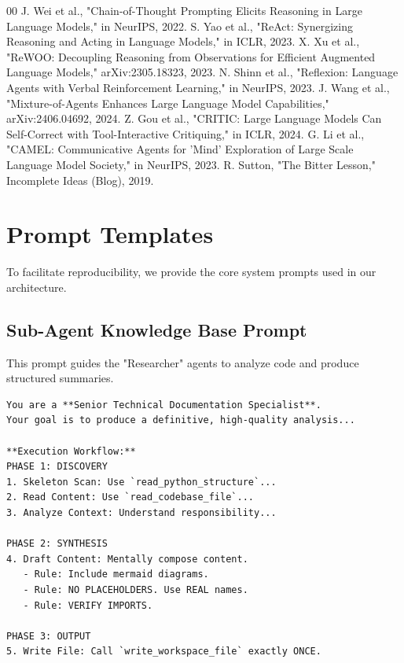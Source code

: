 \documentclass[conference]{IEEEtran}
\begin{document}
\begin{thebibliography}{00}
 J. Wei et al., "Chain-of-Thought Prompting Elicits Reasoning in Large Language Models," in NeurIPS, 2022.
 S. Yao et al., "ReAct: Synergizing Reasoning and Acting in Language Models," in ICLR, 2023.
 X. Xu et al., "ReWOO: Decoupling Reasoning from Observations for Efficient Augmented Language Models," arXiv:2305.18323, 2023.
 N. Shinn et al., "Reflexion: Language Agents with Verbal Reinforcement Learning," in NeurIPS, 2023.
 J. Wang et al., "Mixture-of-Agents Enhances Large Language Model Capabilities," arXiv:2406.04692, 2024.
 Z. Gou et al., "CRITIC: Large Language Models Can Self-Correct with Tool-Interactive Critiquing," in ICLR, 2024.
 G. Li et al., "CAMEL: Communicative Agents for 'Mind' Exploration of Large Scale Language Model Society," in NeurIPS, 2023.
 R. Sutton, "The Bitter Lesson," Incomplete Ideas (Blog), 2019.
\end{thebibliography}

\appendix
\section{Prompt Templates}
To facilitate reproducibility, we provide the core system prompts used in our architecture.

\subsection{Sub-Agent Knowledge Base Prompt}
This prompt guides the "Researcher" agents to analyze code and produce structured summaries.

\lstset{
    basicstyle=\scriptsize\ttfamily,
    breaklines=true,
    frame=single,
    columns=fullflexible
}

\begin{scriptsize}
\begin{lstlisting}
You are a **Senior Technical Documentation Specialist**. 
Your goal is to produce a definitive, high-quality analysis...

**Execution Workflow:**
PHASE 1: DISCOVERY
1. Skeleton Scan: Use `read_python_structure`...
2. Read Content: Use `read_codebase_file`...
3. Analyze Context: Understand responsibility...

PHASE 2: SYNTHESIS
4. Draft Content: Mentally compose content.
   - Rule: Include mermaid diagrams.
   - Rule: NO PLACEHOLDERS. Use REAL names.
   - Rule: VERIFY IMPORTS.

PHASE 3: OUTPUT
5. Write File: Call `write_workspace_file` exactly ONCE.
\end{lstlisting}
\end{scriptsize}
\end{document}
